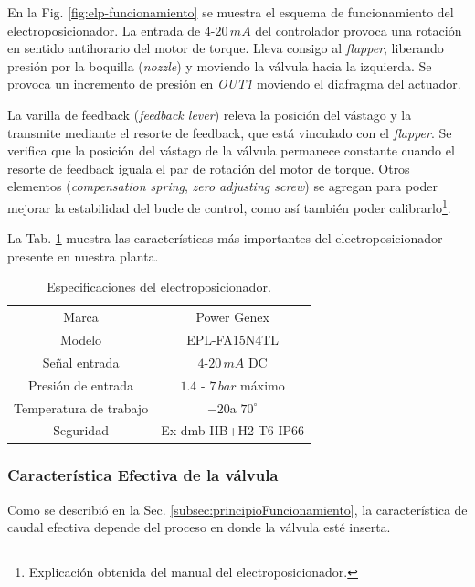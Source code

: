 En la Fig. \ref{fig:elp-funcionamiento} se muestra el esquema de
funcionamiento del electroposicionador.
La entrada de $4$-$20\,mA$ del controlador provoca una rotación en sentido
antihorario del motor de torque.
Lleva consigo al \emph{flapper}, liberando
presión por la boquilla (\emph{nozzle}) y moviendo la válvula hacia la
izquierda.
Se provoca un incremento de presión en \emph{OUT1} moviendo el diafragma del
actuador.

La varilla de feedback (\emph{feedback lever}) releva la posición del vástago y
la transmite mediante el resorte de feedback, que está vinculado con el
\emph{flapper}.
Se verifica que la posición del vástago de la válvula permanece constante
cuando el resorte de feedback iguala el par de rotación del motor de torque.
Otros elementos (\emph{compensation spring}, \emph{zero adjusting screw}) se
agregan para poder mejorar la estabilidad del bucle de control, como así
también poder calibrarlo\footnote{Explicación obtenida del manual del
electroposicionador.}.

La Tab. \ref{tab:especifElectroP} muestra las características más importantes
del electroposicionador presente en nuestra planta.

\begin{table}
 \centering
 \begin{tabular}{|c|c|}
  \hline
  Marca & Power Genex\\
  Modelo & EPL-FA15N4TL\\
  Señal entrada & $4$-$20\,mA$ DC\\
  Presión de entrada & $1.4$ - $7\,bar$ máximo\\
  Temperatura de trabajo & $-20$a $70^\circ$\\
  Seguridad & Ex dmb IIB+H2 T6 IP66\\
  \hline
 \end{tabular}
 \caption{Especificaciones del electroposicionador.}
 \label{tab:especifElectroP}
\end{table}

\subsubsection{Característica Efectiva de la válvula}

Como se describió en la Sec. \ref{subsec:principioFuncionamiento}, la
característica de caudal efectiva depende del proceso en donde la válvula esté
inserta.

